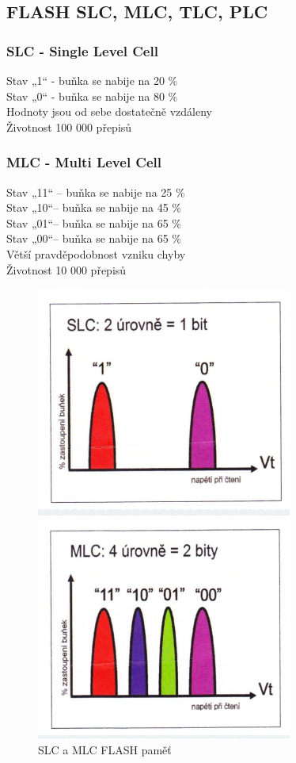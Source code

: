 \subsection{FLASH SLC, MLC, TLC, PLC}
\subsubsection{SLC - Single Level Cell}
Stav „1“ - buňka se nabije na 20 \%\\
Stav „0“ - buňka se nabije na 80 \%\\
Hodnoty jsou od sebe dostatečně vzdáleny\\
Životnost 100 000 přepisů\\
\subsubsection{MLC - Multi Level Cell}
Stav „11“ – buňka se nabije na 25 \%\\
Stav „10“– buňka se nabije na 45 \%\\
Stav „01“– buňka se nabije na 65 \%\\
Stav „00“– buňka se nabije na 65 \%\\
Větší pravděpodobnost vzniku chyby\\
Životnost 10 000 přepisů\\
   \begin{figure}[h]
   \begin{center}
     \includegraphics[scale=0.6]{images/SLC.png}
   \end{center}
   \caption{SLC a MLC FLASH paměť}
  \end{figure}
